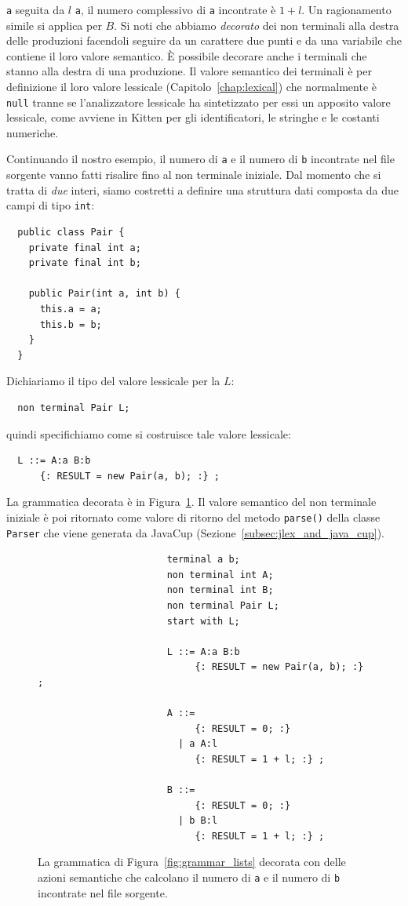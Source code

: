 \texttt{a} seguita da $l$ \texttt{a}, il numero complessivo di \texttt{a}
incontrate \`e $1 + l$. Un ragionamento simile si applica per $B$.
Si noti che abbiamo \emph{decorato} dei non terminali alla destra delle
produzioni facendoli seguire da un carattere due punti e da una variabile
che contiene il loro valore semantico. \`E possibile decorare anche i terminali
che stanno alla destra di una produzione. Il valore semantico dei terminali
\`e per definizione il loro valore lessicale (Capitolo~\ref{chap:lexical})
che normalmente \`e \texttt{null} tranne se l'analizzatore lessicale
ha sintetizzato per essi un apposito valore lessicale, come avviene in Kitten
per gli identificatori, le stringhe e le costanti numeriche.

Continuando il nostro esempio, il numero di \texttt{a} e il numero di
\texttt{b} incontrate nel file sorgente vanno fatti risalire fino al
non terminale iniziale. Dal momento che si tratta di \emph{due} interi,
siamo costretti a definire una struttura dati composta da due campi
di tipo \texttt{int}:
%
\begin{verbatim}
  public class Pair {
    private final int a;
    private final int b;

    public Pair(int a, int b) {
      this.a = a;
      this.b = b;
    }
  }
\end{verbatim}
%
Dichiariamo il tipo del valore lessicale per la $L$:
%
\begin{verbatim}
  non terminal Pair L;
\end{verbatim}
%
quindi specifichiamo come si costruisce tale valore lessicale:
%
\begin{verbatim}
  L ::= A:a B:b
      {: RESULT = new Pair(a, b); :} ;
\end{verbatim}
%
La grammatica decorata \`e in Figura~\ref{fig:grammar_lists_decoration}.
Il valore semantico del non terminale iniziale \`e poi ritornato
come valore di ritorno del metodo \texttt{parse()} della classe
\texttt{Parser} che viene generata da JavaCup
(Sezione~\ref{subsec:jlex_and_java_cup}).
%
\begin{figure}[t]
\begin{verbatim}
                       terminal a b;
                       non terminal int A;
                       non terminal int B;
                       non terminal Pair L;
                       start with L;

                       L ::= A:a B:b
                            {: RESULT = new Pair(a, b); :} ;

                       A ::=
                            {: RESULT = 0; :}
                         | a A:l
                            {: RESULT = 1 + l; :} ;

                       B ::=
                            {: RESULT = 0; :}
                         | b B:l
                            {: RESULT = 1 + l; :} ;
\end{verbatim}
\caption{La grammatica di Figura~\ref{fig:grammar_lists} decorata con delle
         azioni semantiche che calcolano il numero di \texttt{a} e il numero
         di \texttt{b} incontrate nel file sorgente.}
  \label{fig:grammar_lists_decoration}
\end{figure}

